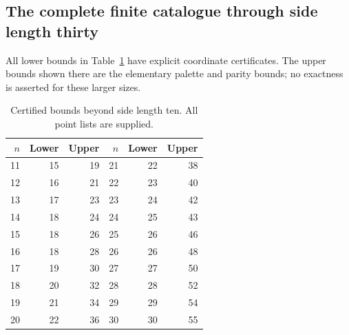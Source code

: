 \subsection{The complete finite catalogue through side length thirty}
All lower bounds in Table~\ref{tab:catalogue} have explicit coordinate
certificates. The upper bounds shown there are the elementary palette
and parity bounds; no exactness is asserted for these larger sizes.
\begin{table}[ht]
\centering
\caption{Certified bounds beyond side length ten. All point lists are supplied.}
\label{tab:catalogue}
\begin{tabular}{rrr@{\qquad}rrr}
\toprule
\(n\)&Lower&Upper&\(n\)&Lower&Upper\\
\midrule
11&15&19&21&22&38\\
12&16&21&22&23&40\\
13&17&23&23&24&42\\
14&18&24&24&25&43\\
15&18&26&25&26&46\\
16&18&28&26&26&48\\
17&19&30&27&27&50\\
18&20&32&28&28&52\\
19&21&34&29&29&54\\
20&22&36&30&30&55\\
\bottomrule
\end{tabular}
\end{table}
